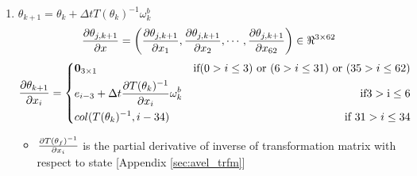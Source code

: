 \begin{enumerate}
\item $\theta_{k+1} = \theta_k + \Delta t T(\theta_k)^{-1} \omega_k^b$
\begin{equation}
\label{eq:dthetadx}
\frac{\partial {\theta_{j,k+1}}}{\partial {x}} = \left(\frac{\partial {\theta_{j,k+1}}}{\partial {x_{1}}}, \frac{\partial {\theta_{j,k+1}}}{\partial {x_{2}}}, \cdots , \frac{\partial {\theta_{j,k+1}}}{\partial {x_{62}}}\right) \in \Re^{3 \times 62}
\end{equation}
\[
 \frac{\partial {\theta_{k+1}}}{\partial {x_{i}}} = \left\lbrace
  \!\begin{aligned}
   &\textbf{0}_{3 \times 1} &\text{if}(0 > i \leq 3) \text{ or }(6 > i \leq 31) \text{ or } (35 > i \leq 62) \\
   &e_{i-3} + \Delta t \frac{\partial {T(\theta_k)^{-1}}}{\partial {x_i}}\omega_k^b & \text{if}3> \text{i} \leq 6 \\
   &col(T(\theta_k)^{-1},i-34) & \text{if } 31 > i \leq 34 \\
  \end{aligned} \right.
\]
\begin{itemize}
\item $\frac{\partial {T(\theta_f)^{-1}}}{\partial {x_i}}$ is the partial derivative of inverse of transformation matrix with respect to state [Appendix \ref{sec:avel_trfm}] 
\end{itemize}


\end{enumerate}
